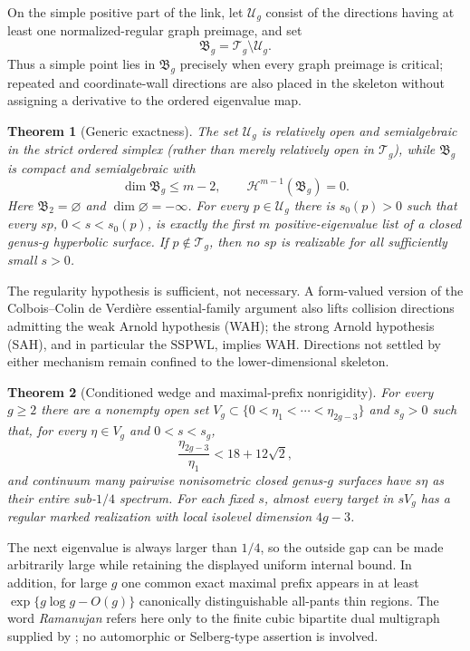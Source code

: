 \documentclass[11pt,reqno]{amsart}
\newtheorem{theorem}{Theorem}[section]
\theoremstyle{definition}
\theoremstyle{remark}
\newcommand{\SSPWL}{\ensuremath{\mathrm{SSPWL}}}
\begin{document}
On the simple positive part of the link, let $\mathcal U_g$ consist of the
directions having at least one normalized-regular graph preimage, and set
\[
 \mathfrak B_g=\mathcal T_g\setminus\mathcal U_g.
\]
Thus a simple point lies in $\mathfrak B_g$ precisely when every graph
preimage is critical; repeated and coordinate-wall directions are also placed
in the skeleton without assigning a derivative to the ordered eigenvalue map.

\begin{theorem}[Generic exactness]\label{thm:intro-generic}
The set $\mathcal U_g$ is relatively open and semialgebraic in the strict
ordered simplex (rather than merely relatively open in $\mathcal T_g$), while
$\mathfrak B_g$ is compact and semialgebraic with
\[
 \dim\mathfrak B_g\le m-2,
 \qquad \mathcal H^{m-1}(\mathfrak B_g)=0.
\]
Here $\mathfrak B_2=\varnothing$ and $\dim\varnothing=-\infty$.
For every $p\in\mathcal U_g$ there is $s_0(p)>0$ such that every $sp$,
$0<s<s_0(p)$, is exactly the first $m$ positive-eigenvalue list of a closed
genus-$g$ hyperbolic surface.  If $p\notin\mathcal T_g$, then no $sp$ is
realizable for all sufficiently small $s>0$.
\end{theorem}

The regularity hypothesis is sufficient, not necessary.  A form-valued
version of the Colbois--Colin de Verdi\`ere essential-family argument
\cite{ColboisCdV1988} also lifts collision directions admitting the weak
Arnold hypothesis (WAH); the strong Arnold hypothesis (SAH), and in particular
the \SSPWL, implies WAH.  Directions not settled by either mechanism remain
confined to the lower-dimensional skeleton.

\begin{theorem}[Conditioned wedge and maximal-prefix nonrigidity]
\label{thm:intro-conditioned}
For every $g\ge2$ there are a nonempty open set
$V_g\subset\{0<\eta_1<\cdots<\eta_{2g-3}\}$ and $s_g>0$ such that, for
every $\eta\in V_g$ and $0<s<s_g$,
\[
 \frac{\eta_{2g-3}}{\eta_1}<18+12\sqrt2,
\]
and continuum many pairwise nonisometric closed genus-$g$ surfaces have
$s\eta$ as their entire sub-$1/4$ spectrum.  For each fixed $s$, almost
every target in $sV_g$ has a regular marked realization with local isolevel
dimension $4g-3$.
\end{theorem}

The next eigenvalue is always larger than $1/4$, so the outside gap can be
made arbitrarily large while retaining the displayed uniform internal
bound.  In addition, for large $g$ one common exact maximal prefix appears
in at least $\exp\{g\log g-O(g)\}$ canonically distinguishable all-pants
thin regions.  The word \emph{Ramanujan} refers here only to the finite
cubic bipartite dual multigraph supplied by \cite{MSS2018}; no automorphic
or Selberg-type assertion is involved.
\end{document}
